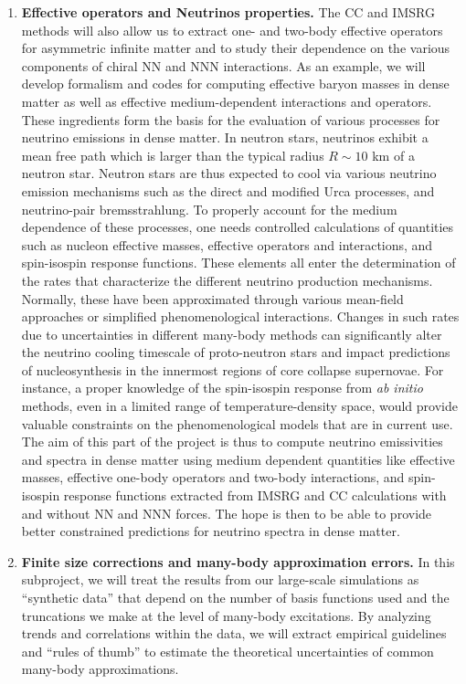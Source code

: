 \begin{enumerate}
\item{\bf Effective operators and Neutrinos properties.} The CC and
  IMSRG methods will also allow us to extract one- and two-body
  effective operators for asymmetric infinite matter and to study
  their dependence on the various components of chiral NN and NNN
  interactions.  As an example, we will develop formalism and codes
  for computing effective baryon masses in dense matter as well as
  effective medium-dependent interactions and operators. These
  ingredients form the basis for the evaluation of various processes
  for neutrino emissions in dense matter. In neutron stars, neutrinos
  exhibit a mean free path which is larger than the typical radius
  $R\sim 10$ km of a neutron star. Neutron stars are thus expected to
  cool via various neutrino emission mechanisms such as the direct and
  modified Urca processes, and neutrino-pair bremsstrahlung. To
  properly account for the medium dependence of these processes, one
  needs controlled calculations of quantities such as nucleon
  effective masses, effective operators and interactions, and
  spin-isospin response functions. These elements all enter the
  determination of the rates that characterize the different neutrino
  production mechanisms. Normally, these have been approximated
  through various mean-field approaches or simplified phenomenological
  interactions. Changes in such rates due to uncertainties in
  different many-body methods can significantly alter the
  neutrino cooling timescale of proto-neutron stars and impact
  predictions of nucleosynthesis in the innermost regions of core
  collapse supernovae.  For instance, a proper knowledge of the
  spin-isospin response from {\em ab initio} methods, even in a
  limited range of temperature-density space, would provide valuable
  constraints on the phenomenological models that are in current
  use. The aim of this part of the project is thus to compute neutrino
  emissivities and spectra in dense matter using medium dependent
  quantities like effective masses, effective one-body operators and
  two-body interactions, and spin-isospin response functions extracted from IMSRG and CC calculations with
  and without NN and NNN forces. The hope is then to be able to
  provide better constrained predictions for neutrino spectra in dense
  matter.

  
\item{\bf Finite size corrections and many-body approximation errors.}
 In this subproject, we will treat the results from our large-scale simulations as ``synthetic data''  that depend on the number of basis functions used and the truncations
we make at the level of many-body excitations. By analyzing trends and correlations within the data, we will extract empirical guidelines and ``rules of thumb'' to estimate the theoretical uncertainties of common many-body approximations. 


\end{enumerate}
